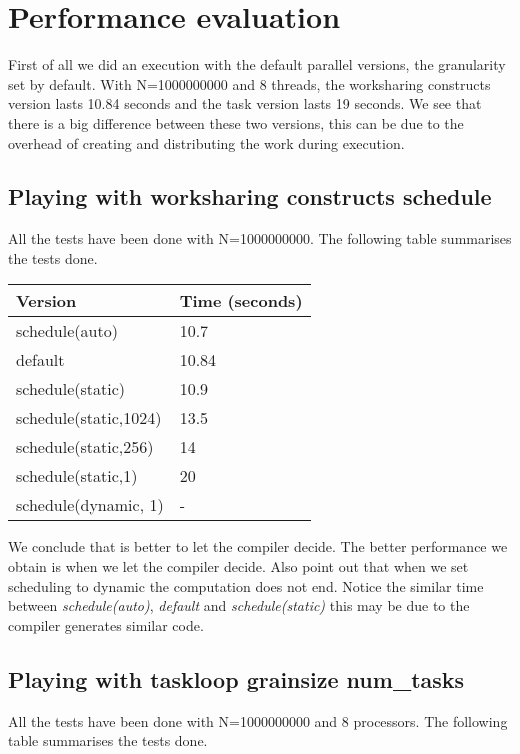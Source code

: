 \section{Performance evaluation}
First of all we did an execution with the default parallel versions, the granularity set by default. With N=1000000000 and 8 threads, the worksharing constructs version lasts 10.84 seconds and the task version lasts 19 seconds. We see that there is a big difference between these two versions, this can be due to the overhead of creating and distributing the work during execution.

\subsection{Playing with worksharing constructs schedule}
\justify
All the tests have been done with N=1000000000. The following table summarises the tests done.

\begin{table}[!h]
\begin{tabular}{|l|l|}
\hline
Version               & Time (seconds) \\ \hline
schedule(auto)        & 10.7           \\ \hline
default               & 10.84          \\ \hline
schedule(static)      & 10.9           \\ \hline
schedule(static,1024) & 13.5           \\ \hline
schedule(static,256)  & 14             \\ \hline
schedule(static,1)    & 20             \\ \hline
schedule(dynamic, 1)  & -              \\ \hline
\end{tabular}
\end{table}
\justify
We conclude that is better to let the compiler decide. The better performance we obtain is when we let the compiler decide. Also point out that when we set scheduling to dynamic the computation does not end. Notice the similar time between \textit{schedule(auto)}, \textit{default} and \textit{schedule(static)} this may be due to the compiler generates similar code.
\subsection{Playing with taskloop grainsize num\_tasks}
All the tests have been done with N=1000000000 and 8 processors. The following table summarises the tests done.

